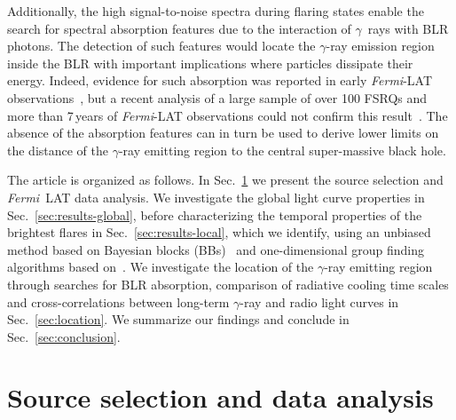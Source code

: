 \documentclass[twocolumn,linenumbers]{aastex62}
\newcommand{\Grays}{$\gamma$~rays\xspace}
\newcommand{\gray}{$\gamma$-ray\xspace}
\newcommand{\FermiLAT}{\emph{Fermi}~LAT\xspace}
\newcommand{\fermiLAT}{\emph{Fermi}-LAT\xspace}
\begin{document}
Additionally, the high signal-to-noise spectra during flaring states enable the search for spectral absorption features due to the interaction of \Grays with BLR photons.
The detection of such features would locate the \gray emission region inside the BLR with important implications where particles dissipate their energy. 
Indeed, evidence for such absorption was reported in early  \fermiLAT observations~\citep{2010ApJ...717L.118P,2014ApJ...794....8S}, but a recent analysis of a large sample of over 100 FSRQs and more than 7\,years of \fermiLAT observations could not confirm this result~\citep{2018MNRAS.477.4749C}.
The absence of the absorption features can in turn be used to derive lower limits on the distance of the \gray emitting region to the central super-massive black hole. 

The article is organized as follows. 
In Sec.~\ref{sec:data} we present the source selection and \FermiLAT data analysis. 
We investigate the global light curve properties in Sec.~\ref{sec:results-global}, before characterizing the temporal properties of the brightest flares in Sec.~\ref{sec:results-local}, which we identify, using an unbiased method based on Bayesian blocks (BBs)~\citep{2013ApJ...764..167S} and one-dimensional group finding algorithms based on~\citet{1998ApJ...498..137E}.
We investigate the location of the \gray emitting region through searches for BLR absorption, comparison of radiative cooling time scales and cross-correlations between long-term \gray and radio light curves in Sec.~\ref{sec:location}. 
We summarize our findings and conclude in Sec.~\ref{sec:conclusion}.

\section{Source selection and data analysis}
\label{sec:data}
\end{document}
